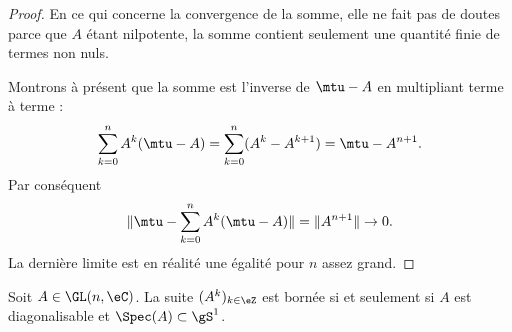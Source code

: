 \begin{proof}
    En ce qui concerne la convergence de la somme, elle ne fait pas de doutes parce que \( A\) étant nilpotente, la somme contient seulement une quantité finie de termes non nuls.

    Montrons à présent que la somme est l'inverse de \( \mtu-A\) en multipliant terme à terme :
    \begin{equation}
        \sum_{k=0}^nA^k(\mtu-A)=\sum_{k=0}^n(A^k-A^{k+1})=\mtu-A^{n+1}.
    \end{equation}
    Par conséquent
    \begin{equation}
        \| \mtu-\sum_{k=0}^nA^k(\mtu-A) \|=\| A^{n+1} \|\to 0.
    \end{equation}
    La dernière limite est en réalité une égalité pour \( n\) assez grand.
\end{proof}

\begin{proposition}
    Soit \( A\in\GL(n,\eC)\). La suite \( (A^k)_{k\in \eZ}\) est bornée si et seulement si \( A\) est diagonalisable et \( \Spec(A)\subset \gS^1\).
\end{proposition}


